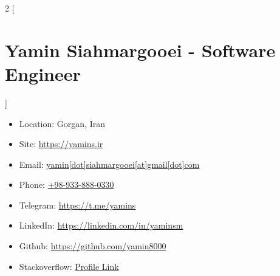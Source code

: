 \begin{multicols}{2}
[\section*{\LARGE{Yamin Siahmargooei - Software Engineer}}]
    \begin{itemize}
        \item Location: Gorgan, Iran
        \item Site: \href{https://yamins.ir}{https://yamins.ir}
        \item Email: \href{mailto:yamin.siahmargooei@gmail.com}{yamin[dot]siahmargooei[at]gmail[dot]com}
        \item Phone: \href{tel:0989338880330}{+98-933-888-0330}
        \item Telegram: \href{https://t.me/yamins}{https://t.me/yamins}
        \item LinkedIn: \href{https://linkedin.com/in/yaminsm}{https://linkedin.com/in/yaminsm}
        \item Github: \href{https://github.com/yamin8000}{https://github.com/yamin8000}
        \item Stackoverflow: \href{https://stackoverflow.com/users/15055605/yamin}{Profile Link}
    \end{itemize}
\end{multicols}